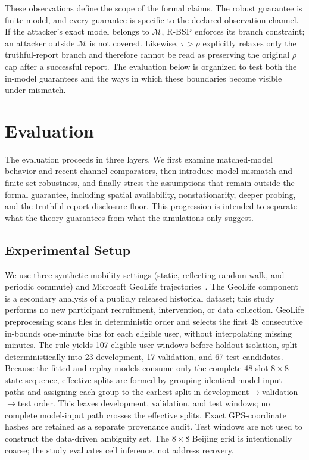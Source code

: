\documentclass[10pt,journal,compsoc]{IEEEtran}
\begin{document}
These observations define the scope of the formal claims. The robust guarantee is finite-model, and every guarantee is specific to the declared observation channel. If the attacker's exact model belongs to $\mathcal M$, R-BSP enforces its branch constraint; an attacker outside $\mathcal M$ is not covered. Likewise, $\tau>\rho$ explicitly relaxes only the truthful-report branch and therefore cannot be read as preserving the original $\rho$ cap after a successful report. The evaluation below is organized to test both the in-model guarantees and the ways in which these boundaries become visible under mismatch.

\section{Evaluation}
\label{sec:experiments}\label{sec:results}
The evaluation proceeds in three layers. We first examine matched-model behavior and recent channel comparators, then introduce model mismatch and finite-set robustness, and finally stress the assumptions that remain outside the formal guarantee, including spatial availability, nonstationarity, deeper probing, and the truthful-report disclosure floor. This progression is intended to separate what the theory guarantees from what the simulations only suggest.

\subsection{Experimental Setup}
We use three synthetic mobility settings (static, reflecting random walk, and periodic commute) and Microsoft GeoLife trajectories~\cite{geolife2008,geolife2009,geolife2010}. The GeoLife component is a secondary analysis of a publicly released historical dataset; this study performs no new participant recruitment, intervention, or data collection. GeoLife preprocessing scans files in deterministic order and selects the first 48 consecutive in-bounds one-minute bins for each eligible user, without interpolating missing minutes. The rule yields 107 eligible user windows before holdout isolation, split deterministically into 23 development, 17 validation, and 67 test candidates. Because the fitted and replay models consume only the complete 48-slot $8\times8$ state sequence, effective splits are formed by grouping identical model-input paths and assigning each group to the earliest split in development$\rightarrow$validation$\rightarrow$test order. This leaves \GeoDevN{} development, \GeoValN{} validation, and \GeoTestN{} test windows; no complete model-input path crosses the effective splits. Exact GPS-coordinate hashes are retained as a separate provenance audit. Test windows are not used to construct the data-driven ambiguity set. The \(8\times8\) Beijing grid is intentionally coarse; the study evaluates cell inference, not address recovery.
\end{document}
